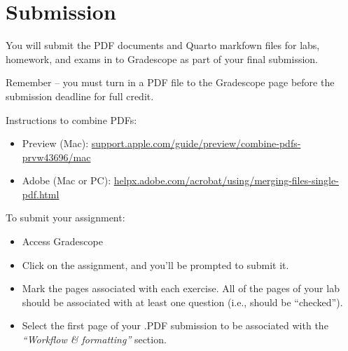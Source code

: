 \documentclass[
  letterpaper,
  DIV=11,
  numbers=noendperiod]{scrartcl}
\begin{document}
\section{Submission}\label{submission}

You will submit the PDF documents and Quarto markfown files for labs,
homework, and exams in to Gradescope as part of your final submission.

\begin{tcolorbox}[enhanced jigsaw, colframe=quarto-callout-warning-color-frame, opacitybacktitle=0.6, coltitle=black, colback=white, rightrule=.15mm, leftrule=.75mm, opacityback=0, left=2mm, colbacktitle=quarto-callout-warning-color!10!white, breakable, toptitle=1mm, bottomtitle=1mm, titlerule=0mm, bottomrule=.15mm, toprule=.15mm, arc=.35mm, title=\textcolor{quarto-callout-warning-color}{\faExclamationTriangle}\hspace{0.5em}{Warning}]

Remember -- you must turn in a PDF file to the Gradescope page before
the submission deadline for full credit.

Instructions to combine PDFs:

\begin{itemize}
\item
  Preview (Mac):
  \href{https://support.apple.com/guide/preview/combine-pdfs-prvw43696/mac}{support.apple.com/guide/preview/combine-pdfs-prvw43696/mac}
\item
  Adobe (Mac or PC):
  \href{https://helpx.adobe.com/acrobat/using/merging-files-single-pdf.html}{helpx.adobe.com/acrobat/using/merging-files-single-pdf.html}
\end{itemize}

\end{tcolorbox}

To submit your assignment:

\begin{itemize}
\item
  Access Gradescope
\item
  Click on the assignment, and you'll be prompted to submit it.
\item
  Mark the pages associated with each exercise. All of the pages of your
  lab should be associated with at least one question (i.e., should be
  ``checked'').
\item
  Select the first page of your .PDF submission to be associated with
  the \emph{``Workflow \& formatting''} section.
\end{itemize}
\end{document}
